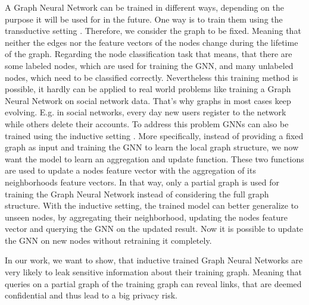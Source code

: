 		A Graph Neural Network can be trained in different ways, depending on the purpose it will be used for in the future.
		One way is to train them using the transductive setting \cite{5206871, ZHA2010187, WANG2017218, 10.1007/978-3-642-04174-7_29}.
		Therefore, we consider the graph to be fixed.
		Meaning that neither the edges nor the feature vectors of the nodes change during the lifetime of the graph.
		Regarding the node classification task that means, that there are some labeled nodes, which are used for training the GNN, and many unlabeled nodes, which need to be classified correctly.
		Nevertheless this training method is possible, it hardly can be applied to real world problems like training a Graph Neural Network on social network data.
		That's why graphs in most cases keep evolving.
		E.g. in social networks, every day new users register to the network while others delete their accounts.
		To address this problem GNNs can also be trained using the inductive setting \cite{zeng2020graphsaint, 8519335, zhang2020document}.
		More specifically, instead of providing a fixed graph as input and training the GNN to learn the local graph structure, we now want the model to learn an aggregation and update function.
		These two functions are used to update a nodes feature vector with the aggregation of its neighborhoods feature vectors.
		In that way, only a partial graph is used for training the Graph Neural Network instead of considering the full graph structure.
		With the inductive setting, the trained model can better generalize to unseen nodes, by aggregating their neighborhood, updating the nodes feature vector and querying the GNN on the updated result.
		Now it is possible to update the GNN on new nodes without retraining it completely.

		In our work, we want to show, that inductive trained Graph Neural Networks are very likely to leak sensitive information about their training graph. 
		Meaning that queries on a partial graph of the training graph can reveal links, that are deemed confidential and thus lead to a big privacy risk.

